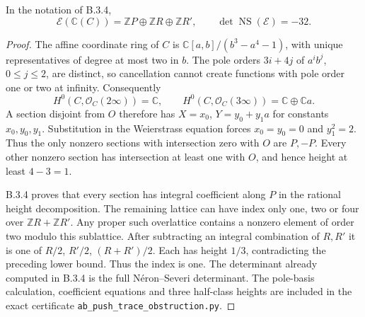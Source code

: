 \begin{corollary}\label{push:src:B.3.5}\label{push:B35}
In the notation of B.3.4,
\[
 \mathscr E(\mathbb C(C))
   =\mathbb ZP\oplus\mathbb ZR\oplus\mathbb ZR',
 \qquad \det\operatorname{NS}(\mathscr E)=-32.
\]
\end{corollary}
\begin{proof}
The affine coordinate ring of $C$ is
$\mathbb C[a,b]/(b^3-a^4-1)$, with
unique representatives of degree at most
two in $b$. The pole orders $3i+4j$ of
$a^ib^j$, $0\le j\le2$, are distinct,
so cancellation cannot create functions
with pole order one or two at infinity.
Consequently
\[
 H^0(C,\mathcal O_C(2\infty))=\mathbb C,
 \qquad
 H^0(C,\mathcal O_C(3\infty))
       =\mathbb C\oplus\mathbb Ca.
\]
A section disjoint from $O$ therefore
has $X=x_0$, $Y=y_0+y_1a$ for constants
$x_0,y_0,y_1$. Substitution in the
Weierstrass equation forces $x_0=y_0=0$
and $y_1^2=2$. Thus the only nonzero
sections with intersection zero with
$O$ are $P,-P$.
Every other nonzero section has
intersection at least one with $O$,
and hence height at least $4-3=1$.

B.3.4 proves that every section has
integral coefficient along $P$ in the
rational height decomposition. The
remaining lattice can have index only
one, two or four over $\mathbb ZR+\mathbb ZR'$.
Any proper such overlattice contains a
nonzero element of order two modulo
this sublattice. After subtracting an
integral combination of $R,R'$ it is
one of $R/2$, $R'/2$, $(R+R')/2$.
Each has height $1/3$, contradicting
the preceding lower bound. Thus the
index is one. The determinant already
computed in B.3.4 is the full
N\'eron--Severi determinant.
The pole-basis calculation, coefficient
equations and three half-class heights
are included in the exact certificate
\texttt{ab\_push\_trace\_obstruction.py}.
\end{proof}

